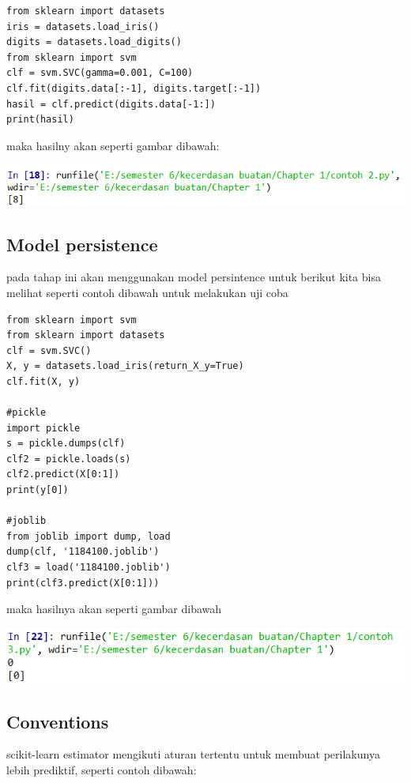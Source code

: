 \documentclass{homework}
\begin{document}
\begin{verbatim}
from sklearn import datasets 
iris = datasets.load_iris()
digits = datasets.load_digits()
from sklearn import svm
clf = svm.SVC(gamma=0.001, C=100)
clf.fit(digits.data[:-1], digits.target[:-1])
hasil = clf.predict(digits.data[-1:])
print(hasil)
\end{verbatim}
maka hasilny akan seperti gambar dibawah:
\begin{center}
    \includegraphics[width=.8\textwidth]{Figure/Hasil2.PNG}
\end{center}

\subsection{Model persistence}
pada tahap ini akan menggunakan model persintence untuk 
berikut kita bisa melihat seperti contoh dibawah untuk melakukan uji coba

\begin{verbatim}
from sklearn import svm
from sklearn import datasets
clf = svm.SVC()
X, y = datasets.load_iris(return_X_y=True)
clf.fit(X, y)

#pickle
import pickle 
s = pickle.dumps(clf)
clf2 = pickle.loads(s)
clf2.predict(X[0:1])
print(y[0])

#joblib
from joblib import dump, load
dump(clf, '1184100.joblib')
clf3 = load('1184100.joblib')
print(clf3.predict(X[0:1]))
\end{verbatim}
maka hasilnya akan seperti gambar dibawah 
\begin{center}
    \includegraphics[width=.8\textwidth]{Figure/hasil3.PNG}
\end{center}

\subsection{Conventions}
scikit-learn estimator mengikuti aturan tertentu untuk membuat perilakunya lebih prediktif,
seperti contoh dibawah:
\end{document}
